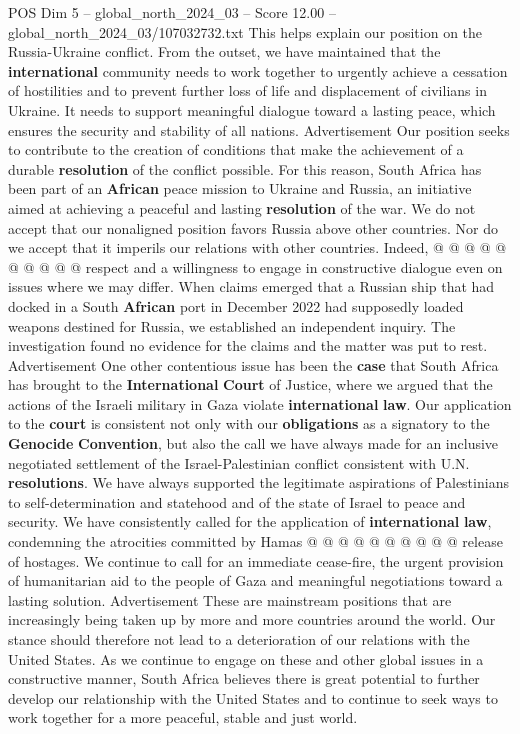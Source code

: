 \begin{textsample}{POS Dim 5 – global\_north\_2024\_03 – Score 12.00 – global\_north\_2024\_03/107032732.txt}
This helps explain our position on the Russia-Ukraine conflict.
From the outset, we have maintained that the \textbf{international} community needs to work together to urgently achieve a cessation of hostilities and to prevent further loss of life and displacement of civilians in Ukraine.
It needs to support meaningful dialogue toward a lasting peace, which ensures the security and stability of all nations.
Advertisement Our position seeks to contribute to the creation of conditions that make the achievement of a durable \textbf{resolution} of the conflict possible.
For this reason, South Africa has been part of an \textbf{African} peace mission to Ukraine and Russia, an initiative aimed at achieving a peaceful and lasting \textbf{resolution} of the war.
We do not accept that our nonaligned position favors Russia above other countries.
Nor do we accept that it imperils our relations with other countries.
Indeed, @ @ @ @ @ @ @ @ @ @ respect and a willingness to engage in constructive dialogue even on issues where we may differ.
When claims emerged that a Russian ship that had docked in a South \textbf{African} port in December 2022 had supposedly loaded weapons destined for Russia, we established an independent inquiry.
The investigation found no evidence for the claims and the matter was put to rest.
Advertisement One other contentious issue has been the \textbf{case} that South Africa has brought to the \textbf{International} \textbf{Court} of Justice, where we argued that the actions of the Israeli military in Gaza violate \textbf{international} \textbf{law}.
Our application to the \textbf{court} is consistent not only with our \textbf{obligations} as a signatory to the \textbf{Genocide} \textbf{Convention}, but also the call we have always made for an inclusive negotiated settlement of the Israel-Palestinian conflict consistent with U.N. \textbf{resolutions}.
We have always supported the legitimate aspirations of Palestinians to self-determination and statehood and of the state of Israel to peace and security.
We have consistently called for the application of \textbf{international} \textbf{law}, condemning the atrocities committed by Hamas @ @ @ @ @ @ @ @ @ @ release of hostages.
We continue to call for an immediate cease-fire, the urgent provision of humanitarian aid to the people of Gaza and meaningful negotiations toward a lasting solution.
Advertisement These are mainstream positions that are increasingly being taken up by more and more countries around the world.
Our stance should therefore not lead to a deterioration of our relations with the United States.
As we continue to engage on these and other global issues in a constructive manner, South Africa believes there is great potential to further develop our relationship with the United States and to continue to seek ways to work together for a more peaceful, stable and just world.

\end{textsample}
